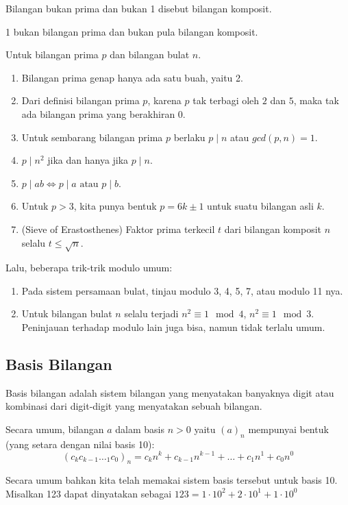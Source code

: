 \documentclass[11pt]{scrartcl}
\begin{document}
    Bilangan bukan prima dan bukan 1 disebut bilangan komposit.
    
    1 bukan bilangan prima dan bukan pula bilangan komposit. 
    
    Untuk bilangan prima $p$ dan bilangan bulat $n$.
    \begin{enumerate}
        \item Bilangan prima genap hanya ada satu buah, yaitu 2.
        \item Dari definisi bilangan prima $p$, karena $p$ tak terbagi oleh $2$ dan $5$, maka tak ada bilangan prima yang berakhiran $0$.
        \item Untuk sembarang bilangan prima $p$ berlaku $p \mid n$ atau $gcd(p,n)=1$.
        \item $p \mid n^2$ jika dan hanya jika $p \mid n$.
        \item $p \mid ab \iff p \mid a \text{ atau } p \mid b$.
        \item Untuk $p > 3$, kita punya bentuk $p = 6k \pm 1$ untuk suatu bilangan asli $k$.
        \item (Sieve of Erastosthenes) 
        Faktor prima terkecil $t$ dari bilangan komposit $n$ selalu $t \le \sqrt{n}$.
        \end{enumerate}
        
    Lalu, beberapa trik-trik modulo umum:
    \begin{enumerate}
        \item Pada sistem persamaan bulat, tinjau modulo 3, 4, 5, 7, atau modulo 11 nya.
        \item Untuk bilangan bulat $n$ selalu terjadi $n^2 \equiv 1 \mod 4$, $n^2 \equiv 1 \mod 3$. Peninjauan terhadap modulo lain juga bisa, namun tidak terlalu umum.
    \end{enumerate}
    
    \subsection{Basis Bilangan}
    Basis bilangan adalah sistem bilangan yang menyatakan banyaknya digit atau kombinasi dari digit-digit yang menyatakan sebuah bilangan.
    
    Secara umum, bilangan $a$ dalam basis $n > 0$ yaitu $(a)_n$ mempunyai bentuk (yang setara dengan nilai basis 10):
    $$(c_kc_{k-1}\dotsc_1c_0)_n = c_{k}n^k + c_{k-1}n^{k-1}+\dots+c_1n^{1}+c_0n^{0}$$
    
    Secara umum bahkan kita telah memakai sistem basis tersebut untuk basis 10. Misalkan 123 dapat dinyatakan sebagai $123 = 1\cdot 10^2 + 2\cdot 10^1 + 1\cdot 10^0$
    
\end{document}
